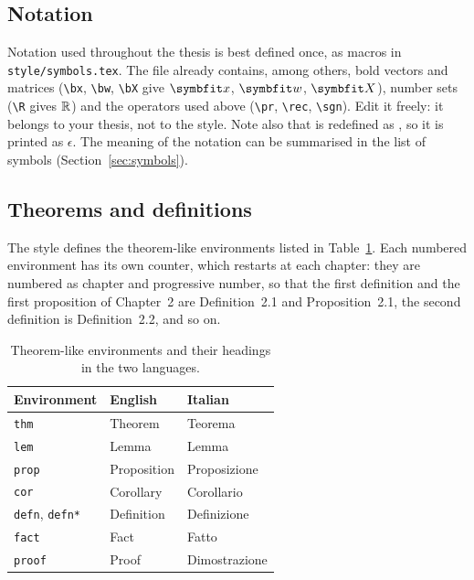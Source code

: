 \subsection{Notation}

Notation used throughout the thesis is best defined once, as macros in
\nolinkurl{style/symbols.tex}. The file already contains, among others, bold
vectors and matrices (\verb|\bx|, \verb|\bw|, \verb|\bX| give $\bx$, $\bw$,
$\bX$), number sets (\verb|\R| gives $\mathbb{R}$) and the operators used above
(\verb|\pr|, \verb|\rec|, \verb|\sgn|). Edit it freely: it belongs to your
thesis, not to the style. Note also that  is redefined as
, so it is printed as $\epsilon$. The meaning of the
notation can be summarised in the list of symbols
(Section~\ref{sec:symbols}).

\subsection{Theorems and definitions} \label{sec:theorems}

The style defines the theorem-like environments listed in
Table~\ref{tab:theorems}. Each numbered environment has its own counter,
which restarts at each chapter: they are numbered as chapter and
progressive number, so that the first definition and the first
proposition of Chapter~2 are Definition~2.1 and Proposition~2.1, the
second definition is Definition~2.2, and so on.

\begin{table}[htbp]
  \centering
  \caption[Theorem-like environments]{Theorem-like environments and their
    headings in the two languages.}
  \label{tab:theorems}
  \begin{tabular}{lll}
    \toprule
    Environment & English & Italian \\
    \midrule
    \texttt{thm}       & Theorem      & Teorema \\
    \texttt{lem}       & Lemma        & Lemma \\
    \texttt{prop}      & Proposition  & Proposizione \\
    \texttt{cor}       & Corollary    & Corollario \\
    \texttt{defn}, \texttt{defn*} & Definition & Definizione \\
    \texttt{fact}      & Fact         & Fatto \\
    \texttt{proof}     & Proof        & Dimostrazione \\
    \bottomrule
  \end{tabular}
\end{table}

